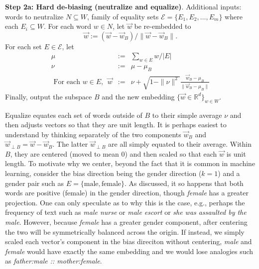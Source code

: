 \documentclass{article}
\begin{document}
\smallskip

{\bf Step 2a: Hard de-biasing (neutralize and equalize)}. Additional inputs: words to neutralize $N\subseteq W$, family of equality sets $\mathcal{E} = \{E_1, E_2, \ldots, E_m\}$ where each $E_i \subseteq W$. For each word $w\in N$, let $\vec{w}$ be re-embedded to $$\vec{w} := (\vec{w} - \vec{w}_B)\bigl/\|\vec{w} - \vec{w}_B\|.$$ 
For each set $E\in \mathcal{E}$, let 
\begin{eqnarray*}
\mu &:=& \sum_{w \in E} w/|E|\\
\nu &:=& \mu - \mu_B\\
\text{ For each }w \in E, ~~ \vec{w} &:=& \nu + \sqrt{1-\|\nu\|^2}\frac{\vec{w}_B-\mu_B}{\|\vec{w}_B-\mu_B\|}
\end{eqnarray*}
Finally, output the subspace $B$ and the new embedding $\bigr\{\vec{w} \in \mathbb{R}^d\bigl\}_{w \in W}$.

Equalize equates each set of words outside of $B$ to their simple average $\nu$ and then adjusts vectors so that they are unit length. It is perhaps easiest to understand by thinking separately of the two components $\vec{w}_B$ and $\vec{w}_{\perp B} = \vec{w}-\vec{w}_B$. The latter $\vec{w}_{\perp B}$ are all simply equated to their average. Within $B$, they are centered (moved to mean 0) and then scaled so that each $\vec{w}$ is unit length. To motivate why we center, beyond the fact that it is common in machine learning, consider the bias direction being the gender direction ($k=1$) and a gender pair such as $E=\{\text{male}, \text{female}\}$. As discussed, it so happens that both words are positive  (female) in the gender direction, though {\em female} has a greater projection. One can only speculate as to why this is the case, e.g., perhaps the frequency of text such as {\em male nurse} or {\em male escort} or {\em she was assaulted by the male}. However, because {\em female} has a greater gender component, after centering the two will be symmetrically balanced across the origin. If instead, we simply scaled each vector's component in the bias direciton without centering, {\em male} and {\em female} would have exactly the same embedding and we would lose analogies such as {\em father:male :: mother:female}.
\end{document}

